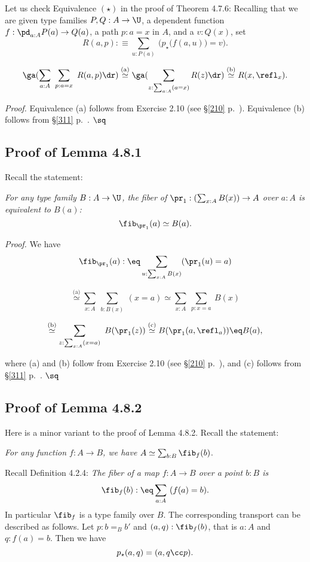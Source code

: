 \documentclass[12pt]{article}
\begin{document}
Let us check Equivalence $(\star)$ in the proof of Theorem 4.7.6: Recalling that we are given type families $P,Q:A\to\U$, a dependent function $f:\pd_{a:A}P(a)\to Q(a)$, a path $p:a=x$ in $A$, and a $v:Q(x)$, set 
$$
R(a,p):\equiv\sum_{u:P(a)}\ \Big(p_\star\big(f(a,u)\big)=v\Big).
$$ 

\nn{}
$$
\ga(\sum_{a:A}\ \sum_{p:a=x}\ R(a,p)\dr)\overset{(\text a)}{\simeq}
\ga(\sum_{z:\sum_{a:A}(a=x)}R(z)\dr)\overset{(\text b)}{\simeq}
R(x,\refl_x).
$$

\nn\emph{Proof.} Equivalence (a) follows from Exercise 2.10 (see \S\ref{210} p.~\pageref{210}). Equivalence (b) follows from \S\ref{311} p.~\pageref{311}. $\sq$


\subsection{Proof of Lemma 4.8.1}\label{481}

Recall the statement:

\emph{For any type family $B:A\to\U$, the fiber of $\pr_1:(\sum_{x:A}B(x))\to A$ over $a:A$ is equivalent to $B(a)$:}
$$
\fib_{\pr_1}(a)\simeq B(a).
$$

\nn\emph{Proof.} We have
$$\fib_{\pr_1}(a):\eq\sum_{u:\sum_{x:A}B(x)}(\pr_1(u)=a)$$

$$\overset{\text{(a)}}\simeq\sum_{x:A}\ \sum_{b:B(x)}\ (x=a)\simeq\sum_{x:A}\ \sum_{p:x=a}\ B(x)$$

$$\overset{\text{(b)}}\simeq\sum_{z:\sum_{x:A}(x=a)}\ B(\pr_1(z))\overset{\text{(c)}}\simeq B(\pr_1(a,\refl_a))\eq B(a),$$ 

\nn where (a) and (b) follow from Exercise 2.10 (see \S\ref{210} p.~\pageref{210}), and (c) follows from \S\ref{311} p.~\pageref{311}. $\sq$


\subsection{Proof of Lemma 4.8.2}\label{482}

Here is a minor variant to the proof of Lemma 4.8.2. Recall the statement:

\emph{For any function $f:A\to B$, we have} $A\simeq\sum_{b:B}\fib_f(b)$.

Recall Definition 4.2.4: \emph{The fiber of a map $f:A\to B$ over a point $b:B$ is} 
$$
\fib_f(b):\eq\sum_{a:A}\ (f(a)=b).
$$ 
In particular $\fib_f$ is a type family over $B$. The corresponding transport can be described as follows. Let $p:b=_Bb'$ and $(a,q):\fib_f(b)$, that is $a:A$ and $q:f(a)=b$. Then we have 
\begin{equation}\label{paq}
p_\star(a,q)=(a,q\cc p).
\end{equation}
\end{document}
